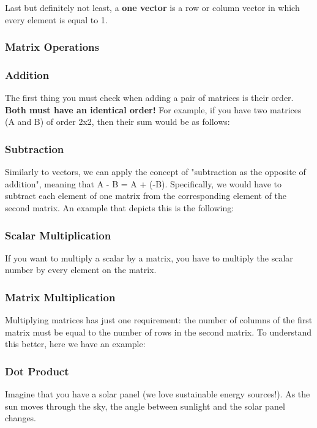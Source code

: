 Last but definitely not least, a \textbf{one vector} is a row or column vector in which every element is equal to 1.
\subsubsection{Matrix Operations}
\subsubsection{Addition}
The first thing you must check when adding a pair of matrices is their order. \textbf{Both must have an identical order!} For example, if you have two matrices (A and B) of order 2x2, then their sum would be as follows:

\subsubsection{Subtraction}
Similarly to vectors, we can apply the concept of "subtraction as the opposite of addition", meaning that A - B = A + (-B). Specifically, we would have to subtract each element of one matrix from the corresponding element of the second matrix. An example that depicts this is the following:

\subsubsection{Scalar Multiplication}
If you want to multiply a scalar by a matrix, you have to multiply the scalar number by every element on the matrix. 

\subsubsection{Matrix Multiplication}
Multiplying matrices has just one requirement: the number of columns of the first matrix must be equal to the number of rows in the second matrix. To understand this better, here we have an example:

\subsubsection{Dot Product}
Imagine that you have a solar panel (we love sustainable energy sources!). As the sun moves through the sky, the angle between sunlight and the solar panel changes.


